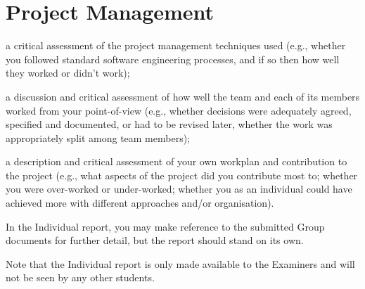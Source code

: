 \section{Project Management}
    a critical assessment of the project management techniques used (e.g.,
    whether you followed standard software engineering processes, and if so then
    how well they worked or didn't work);

    a discussion and critical assessment of how well the team and each of its
    members worked from your point-of-view (e.g., whether decisions were
    adequately agreed, specified and documented, or had to be revised later,
    whether the work was appropriately split among team members);

    a description and critical assessment of your own workplan and contribution
    to the project (e.g., what aspects of the project did you contribute most
    to; whether you were over-worked or under-worked; whether you as an
    individual could have achieved more with different approaches and/or
    organisation).

In the Individual report, you may make reference to the submitted Group
documents for further detail, but the report should stand on its own.

Note that the Individual report is only made available to the Examiners and will
not be seen by any other students.



